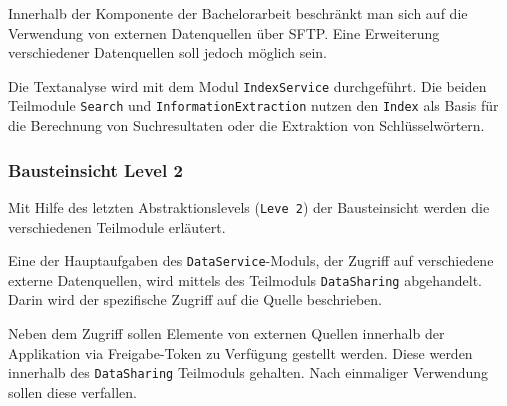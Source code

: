 Innerhalb der Komponente der Bachelorarbeit beschränkt man sich auf die Verwendung von externen Datenquellen über \gls{SFTP}. Eine Erweiterung verschiedener Datenquellen soll jedoch möglich sein.





Die Textanalyse wird mit dem Modul \texttt{IndexService} durch\-ge\-führt. Die beiden Teilmodule \texttt{Search} und \texttt{InformationExtraction} nutzen den \texttt{Index} als Basis für die Berechnung von Suchresultaten oder die Extraktion von Schlüsselwörtern.


\subsubsection{Bausteinsicht Level 2}


Mit Hilfe des letzten Abstraktionslevels (\texttt{Leve 2}) der Bausteinsicht werden die verschiedenen Teilmodule erläutert.




Eine der Hauptaufgaben des \texttt{DataService}-Moduls, der Zugriff auf verschiedene externe Datenquellen, wird mittels des Teilmoduls \texttt{Da\-ta\-Sharing} abgehandelt. Darin wird der spezifische Zugriff auf die Quelle beschrieben.




Neben dem Zugriff sollen Elemente von externen Quellen innerhalb der Applikation via Freigabe-Token zu Verfügung gestellt werden. Diese werden innerhalb des \texttt{DataSharing} Teilmoduls gehalten. Nach einmaliger Verwendung sollen diese verfallen.


